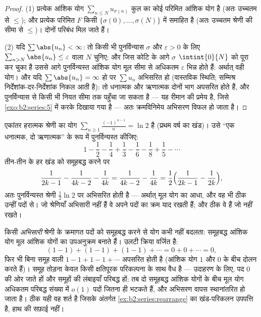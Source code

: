\begin{proof}
(1) प्रत्येक आंशिक योग $\sum_{n \leq N} u_{\sigma(n)}$ कुल का कोई परिमित आंशिक योग है (अतः उच्चतम
से $\leq$); और प्रत्येक परिमित $F$ किसी $\{\sigma(0), \dots, \sigma(N)\}$ में समाहित है (अतः उच्चतम
श्रेणी की सीमा से $\leq$)। दोनों परिबंध मिल जाते हैं।

(2) यदि $\sum\abs{u_n} < \infty$: तो किसी भी पुनर्विन्यास $\sigma$ और $\varepsilon > 0$ के लिए $\sum_{n > N}\abs{u_n} \leq
\varepsilon$ वाला $N$
चुनिए; और जिस कोटि के आगे $\sigma$ $\intint{0}{N}$ को पूरा कर चुका है उससे आगे
पुनर्विन्यस्त आंशिक योग मूल सीमा से अधिकतम $\varepsilon$ भिन्न होते हैं: अर्थात्
वही योग। और यदि $\sum
\abs{u_n} = \infty$ हो पर $\sum u_n$ अभिसरित हो (वास्तविक स्थिति; सम्मिश्र
निर्देशांक-दर-निर्देशांक निकल आती है): तो धनात्मक और ऋणात्मक दोनों भाग
अपसरित होते हैं, और पुनर्विन्यास से किसी भी नियत सीमा तक पहुँचा जा सकता
है --- यह रीमान की प्रमेय है, जिसे \cref{exo:b2:series:5} में करके दिखाया गया है --- अतः
क्रमविनिमेय अभिसरण विफल हो जाता है।
\end{proof}

\begin{example}[रंगे हाथ पकड़ा गया एक पुनर्विन्यास]\label{ex:b2:series:rearrange}
एकांतर हरात्मक श्रेणी का योग $\sum_{n\geq1}\frac{(-1)^{n-1}}{n} = \ln 2$ है (प्रथम वर्ष का खंड)। उसे ``एक
धनात्मक, दो ऋणात्मक'' के रूप में पुनर्विन्यस्त कीजिए:
\[
1 - \frac12 - \frac14 + \frac13 - \frac16 - \frac18 + \frac15 -
\cdots
\]
तीन-तीन के हर खंड को समूहबद्ध करने पर
\[
\frac{1}{2k-1} - \frac{1}{4k-2} - \frac1{4k}
= \frac{1}{4k-2} - \frac{1}{4k}
= \frac12\Bigl(\frac{1}{2k-1} - \frac1{2k}\Bigr),
\]
अतः पुनर्विन्यस्त श्रेणी $\frac12\ln 2$ पर अभिसरित होती है --- अर्थात् मूल योग का
आधा, और वह भी ठीक उन्हीं पदों से। जो श्रेणियाँ  अभिसारी
नहीं हैं वे अपने पदों का क्रम याद रखती हैं; और  ठीक वे हैं जो
नहीं रखते।
\end{example}

\begin{example}\label{ex:b2:series:grouping}
किसी \emph{अभिसारी} श्रेणी के क्रमागत पदों को समूहबद्ध करने से योग कभी
नहीं बदलता: समूहबद्ध आंशिक योग मूल आंशिक योगों का उपअनुक्रम बनाते हैं।
उलटी क्रिया वर्जित है:
\[
(1 - 1) + (1 - 1) + (1 - 1) + \cdots = 0 + 0 + \cdots = 0,
\]
फिर भी बिना समूह वाली $1 - 1 + 1 - 1 + \cdots$ अपसरित होती है (आंशिक योग $1$ और $0$ के बीच
दोलन करते हैं)। समूह तोड़ना केवल किसी क्षतिपूरक परिकल्पना के साथ वैध है
--- उदाहरण के लिए, पद $0$ की ओर जाते हों और समूहों की लंबाइयाँ परिबद्ध
हों: तब दो समूहबद्ध आंशिक योगों के बीच मूल योग अधिकतम परिबद्ध संख्या में
$o(1)$ पदों जितना ही भटकते हैं, और अभिसरण वापस स्थानांतरित हो जाता है। ठीक
यही वह शर्त है जिसके अंतर्गत \cref{ex:b2:series:rearrange} का खंड-परिकलन उपपत्ति है, हाथ की सफ़ाई
नहीं।
\end{example}

